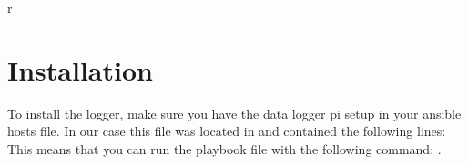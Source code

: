 r\section{Installation}
To install the logger, make sure you have the data logger pi setup in your ansible hosts file. In our case this file was located in   and contained the following lines:\newline 
 \newline
This means that you can run the playbook file  with the following command: .